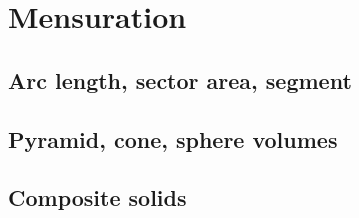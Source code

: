 
\section{Mensuration}

\subsection{Arc length, sector area, segment}


\subsection{Pyramid, cone, sphere volumes}


\subsection{Composite solids}

